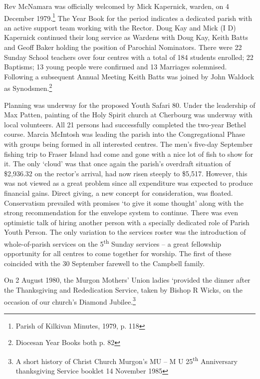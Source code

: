Rev McNamara was officially welcomed by Mick Kapernick, warden, on 4 December 1979.\footnote{Parish of Kilkivan Minutes, 1979, p. 118} The Year Book for the period indicates a dedicated parish with an active support team working with the Rector. Doug Kay and Mick (I D) Kapernick continued their long service as Wardens with Doug Kay, Keith Batts and Geoff Baker holding the position of Parochial Nominators. There were 22 Sunday School teachers over four centres with a total of 184 students enrolled; 22 Baptisms; 13 young people were confirmed and 13 Marriages solemnised. Following a subsequent Annual Meeting Keith Batts was joined by John Waldock as Synodsmen.\footnote{Diocesan Year Books both p. 82}


Planning was underway for the proposed Youth Safari 80. Under the leadership of Max Patten, painting of the Holy Spirit church at Cherbourg was underway with local volunteers. All 21 persons had successfully completed the two-year Bethel course. Marcia McIntosh was leading the parish into the Congregational Phase with groups being formed in all interested centres. The men's five-day September fishing trip to Fraser Island had come and gone with a nice lot of fish to show for it. The only `cloud' was that once again the parish's overdraft situation of \$2,936.32 on the rector's arrival, had now risen steeply to \$5,517. However, this was not viewed as a great problem since all expenditure was expected to produce financial gains. Direct giving, a new concept for consideration, was floated. Conservatism prevailed with promises `to give it some thought' along with the strong recommendation for the envelope system to continue. There was even optimistic talk of hiring another person with a specially dedicated role of Parish Youth Person. The only variation to the services roster was the introduction of whole-of-parish services on the 5\textsuperscript{th} Sunday services -- a great fellowship opportunity for all centres to come together for worship. The first of these coincided with the 30 September farewell to the Campbell family.



On 2 August 1980, the Murgon Mothers' Union ladies `provided the dinner after the Thanksgiving and Rededication Service, taken by Bishop R Wicks, on the occasion of our church's Diamond Jubilee.\footnote{A short history of Christ Church Murgon's MU -- M U 25\textsuperscript{th} Anniversary thanksgiving Service booklet 14 November 1985}



